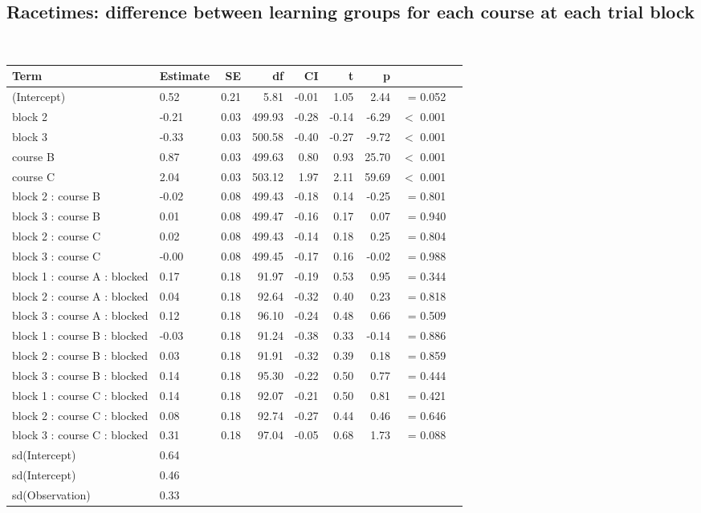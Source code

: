 \subsection{Racetimes: difference between learning groups for each course at each trial block}\
\begin{table}[ht]\label{paper1: racetimedifferencebetweentreatments}
\centering
\begin{tabular}{llrrrrrrl}
  \hline
Term & Estimate & SE & df & CI & t & p \\ 
  \hline
(Intercept) & 0.52 & 0.21 & 5.81 & -0.01 & 1.05 & 2.44 &  =  0.052 \\ 
block 2 & -0.21 & 0.03 & 499.93 & -0.28 & -0.14 & -6.29 &  $<$  0.001 \\ 
block 3 & -0.33 & 0.03 & 500.58 & -0.40 & -0.27 & -9.72 &  $<$  0.001 \\ 
course B & 0.87 & 0.03 & 499.63 & 0.80 & 0.93 & 25.70 &  $<$  0.001 \\ 
course C & 2.04 & 0.03 & 503.12 & 1.97 & 2.11 & 59.69 &  $<$  0.001 \\ 
block 2 : course B & -0.02 & 0.08 & 499.43 & -0.18 & 0.14 & -0.25 &  =  0.801 \\ 
block 3 : course B & 0.01 & 0.08 & 499.47 & -0.16 & 0.17 & 0.07 &  =  0.940 \\ 
block 2 : course C & 0.02 & 0.08 & 499.43 & -0.14 & 0.18 & 0.25 &  =  0.804 \\ 
block 3 : course C & -0.00 & 0.08 & 499.45 & -0.17 & 0.16 & -0.02 &  =  0.988 \\ 
block 1 : course A : blocked & 0.17 & 0.18 & 91.97 & -0.19 & 0.53 & 0.95 &  =  0.344 \\ 
block 2 : course A : blocked & 0.04 & 0.18 & 92.64 & -0.32 & 0.40 & 0.23 &  =  0.818 \\ 
block 3 : course A : blocked & 0.12 & 0.18 & 96.10 & -0.24 & 0.48 & 0.66 &  =  0.509 \\ 
block 1 : course B : blocked & -0.03 & 0.18 & 91.24 & -0.38 & 0.33 & -0.14 &  =  0.886 \\ 
block 2 : course B : blocked & 0.03 & 0.18 & 91.91 & -0.32 & 0.39 & 0.18 &  =  0.859 \\ 
block 3 : course B : blocked & 0.14 & 0.18 & 95.30 & -0.22 & 0.50 & 0.77 &  =  0.444 \\ 
block 1 : course C : blocked & 0.14 & 0.18 & 92.07 & -0.21 & 0.50 & 0.81 &  =  0.421 \\ 
block 2 : course C : blocked & 0.08 & 0.18 & 92.74 & -0.27 & 0.44 & 0.46 &  =  0.646 \\ 
block 3 : course C : blocked & 0.31 & 0.18 & 97.04 & -0.05 & 0.68 & 1.73 &  =  0.088 \\ 
sd(Intercept) & 0.64 &  &  &  &  &  &  \\ 
sd(Intercept) & 0.46 &  &  &  &  &  &  \\ 
sd(Observation) & 0.33 &  &  &  &  &  &  \\ 
   \hline
\end{tabular}
\end{table}

